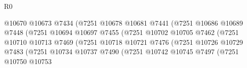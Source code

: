 \begin{lexlean}{R0}
\begin{coremodule}
                                              @10670
                                              @10673
                                              @7434
                                              (@7251
                                                @10678
                                                @10681
                                                @7441
                                                (@7251
                                                  @10686
                                                  @10689
                                                  @7448
                                                  (@7251
                                                    @10694
                                                    @10697
                                                    @7455
                                                    (@7251
                                                      @10702
                                                      @10705
                                                      @7462
                                                      (@7251
                                                        @10710
                                                        @10713
                                                        @7469
                                                        (@7251
                                                          @10718
                                                          @10721
                                                          @7476
                                                          (@7251
                                                            @10726
                                                            @10729
                                                            @7483
                                                            (@7251
                                                              @10734
                                                              @10737
                                                              @7490
                                                              (@7251
                                                                @10742
                                                                @10745
                                                                @7497
                                                                (@7251
                                                                  @10750
                                                                  @10753

\end{coremodule}
\end{lexlean}
